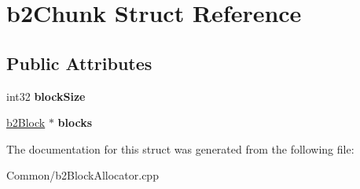 \hypertarget{structb2Chunk}{}\section{b2\+Chunk Struct Reference}
\label{structb2Chunk}
\subsection*{Public Attributes}
\begin{DoxyCompactItemize}
\item 
\mbox{\label{structb2Chunk_a731df6d026298426622990c251cf742a}} 
int32 {\bfseries block\+Size}
\item 
\mbox{\label{structb2Chunk_aa45617a36287b3dea2130c426cfd42d2}} 
\mbox{\hyperlink{structb2Block}{b2\+Block}} $\ast$ {\bfseries blocks}
\end{DoxyCompactItemize}


The documentation for this struct was generated from the following file\+:\begin{DoxyCompactItemize}
\item 
Common/b2\+Block\+Allocator.\+cpp\end{DoxyCompactItemize}
